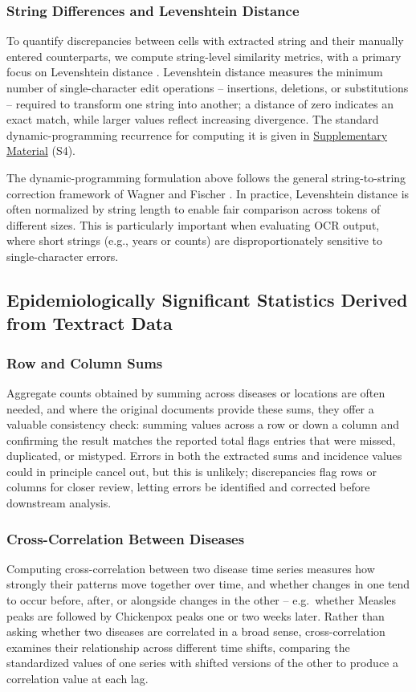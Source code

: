 \documentclass[12pt]{article}
\begin{document}
\subsubsection{String Differences and Levenshtein Distance} \label{sec:levdist}
To quantify discrepancies between cells with extracted string and their manually entered counterparts, we compute string-level similarity metrics, with a primary focus on Levenshtein distance \cite{Levenshtein1965BinaryCC}. Levenshtein distance measures the minimum number of single-character edit operations -- insertions, deletions, or substitutions -- required to transform one string into another; a distance of zero indicates an exact match, while larger values reflect increasing divergence. The standard dynamic-programming recurrence for computing it is given in \hyperref[sec:supp]{Supplementary Material} (S4).

The dynamic-programming formulation above follows the general string-to-string correction framework of Wagner and Fischer \cite{wagner1974string}. In practice, Levenshtein distance is often normalized by string length to enable fair comparison across tokens of different sizes. This is particularly important when evaluating OCR output, where short strings (e.g., years or counts) are disproportionately sensitive to single-character errors.


\subsection{Epidemiologically Significant Statistics Derived from Textract Data}

\subsubsection{Row and Column Sums}
Aggregate counts obtained by summing across diseases or locations are often needed, and where the original documents provide these sums, they offer a valuable consistency check: summing values across a row or down a column and confirming the result matches the reported total flags entries that were missed, duplicated, or mistyped. Errors in both the extracted sums and incidence values could in principle cancel out, but this is unlikely; discrepancies flag rows or columns for closer review, letting errors be identified and corrected before downstream analysis.

\subsubsection{Cross-Correlation Between Diseases}
Computing cross-correlation between two disease time series measures how strongly their patterns move together over time, and whether changes in one tend to occur before, after, or alongside changes in the other -- e.g.\ whether Measles peaks are followed by Chickenpox peaks one or two weeks later. Rather than asking whether two diseases are correlated in a broad sense, cross-correlation examines their relationship across different time shifts, comparing the standardized values of one series with shifted versions of the other to produce a correlation value at each lag.
\end{document}
